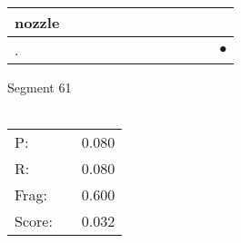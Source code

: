\documentclass[landscape]{article}
\newcommand{\ssp}{\hspace{2pt}}
\newcommand{\mex}{\cellcolor{g}$\bullet$}
\begin{document}
\begin{tabular}{|l|p{10pt}|p{10pt}|p{10pt}|p{10pt}|p{10pt}|p{10pt}|p{10pt}|p{10pt}|p{10pt}|p{10pt}|p{10pt}|}
\hline
\ssp nozzle \ssp&\hspace{2pt}&\hspace{2pt}&\hspace{2pt}&\hspace{2pt}&\hspace{2pt}&\hspace{2pt}&\hspace{2pt}&\hspace{2pt}&\hspace{2pt}&\hspace{2pt}&\hspace{2pt}\\
\hline
\ssp \cellcolor{ref10}. \ssp&\hspace{2pt}&\hspace{2pt}&\hspace{2pt}&\hspace{2pt}&\hspace{2pt}&\hspace{2pt}&\hspace{2pt}&\hspace{2pt}&\hspace{2pt}&\hspace{2pt}&\hspace{2pt}\mex\\
\hline
\end{tabular}

\vspace{6pt}
\noindent Segment 61\\\\
\noindent\begin{tabular}{lm{12pt}r}
\hline
P:&&0.080\\
R:&&0.080\\
Frag:&&0.600\\
Score:&&0.032\\
\end{tabular}

\newpage
\end{document}
